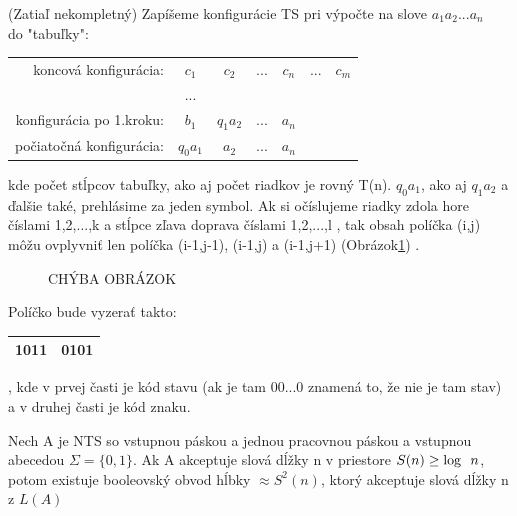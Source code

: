 \begin{dokaz}(Zatiaľ nekompletný) Zapíšeme konfigurácie TS pri výpočte na slove
$a_1a_2...a_n$\\ do "tabuľky":
\begin{center}
\begin{tabular}{rcccccc}

   koncová konfigurácia:& $c_1$    &  $c_2$   & $...$ & $c_n$  & $...$ & $c_m$ \\

                        & $...$    &          &       &     \\

konfigurácia po 1.kroku:& $b_1$    & $q_1a_2$ & $...$ & $a_n$     \\

počiatočná konfigurácia:& $q_0a_1$ & $a_2$    & $...$ & $a_n$     \\

\end{tabular}
\end{center}
kde počet stĺpcov tabuľky, ako aj počet riadkov je rovný T(n). $q_0a_1$, ako aj $q_1a_2$
a ďalšie také, prehlásime za jeden symbol. Ak si očíslujeme riadky zdola hore číslami
1,2,...,k a stĺpce zľava doprava číslami 1,2,...,l , tak obsah políčka (i,j) môžu
ovplyvniť len políčka (i-1,j-1), (i-1,j) a (i-1,j+1) (Obrázok\ref{BObr4}) .
\begin{figure}[!ht]
\centering
\caption{CHÝBA OBRÁZOK} \label{BObr4}
\end{figure}

Políčko bude vyzerať takto: \begin{tabular}{|c|c|} \hline 1011 & 0101 \\ \hline
\end{tabular}, kde v prvej časti je kód stavu (ak je tam 00...0 znamená to, že nie je tam
stav) a v druhej časti je kód znaku.

\end{dokaz}

\begin{veta}
Nech A je NTS so vstupnou páskou a jednou pracovnou páskou a vstupnou abecedou
$\Sigma=\{0,1\}$. Ak A akceptuje slová dĺžky n v priestore $S(n)\geq \log\enspace n$, potom
existuje booleovský obvod hĺbky $\approx S^2(n)$, ktorý akceptuje slová dĺžky n z $L(A)$
\end{veta}

